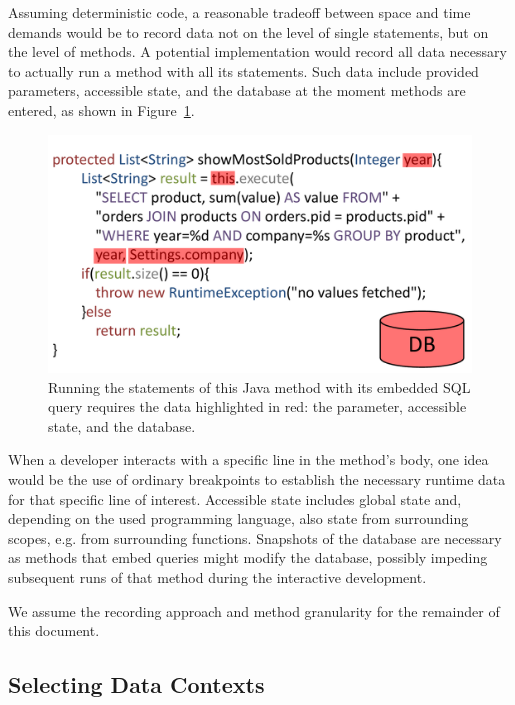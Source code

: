 Assuming deterministic code, a reasonable tradeoff between space and time demands would be to record data not on the level of single statements, but on the level of methods.
A potential implementation would record all data necessary to actually run a method with all its statements.
Such data include provided parameters, accessible state, and the database at the moment methods are entered, as shown in Figure~\ref{fig:context_recording}.

\begin{figure}
    \includegraphics[width=\linewidth]{images/context}
    \caption{Running the statements of this Java method with its embedded SQL query requires the data highlighted in red: the parameter, accessible state, and the database.}
    \label{fig:context_recording}
\end{figure}

When a developer interacts with a specific line in the method's body, one idea would be the use of ordinary breakpoints to establish the necessary runtime data for that specific line of interest. 
Accessible state includes global state and, depending on the used programming language, also state from surrounding scopes, e.g. from surrounding functions.
Snapshots of the database are necessary as methods that embed queries might modify the database, possibly impeding subsequent runs of that method during the interactive development.

We assume the recording approach and method granularity for the remainder of this document.

\subsection{Selecting Data Contexts}

